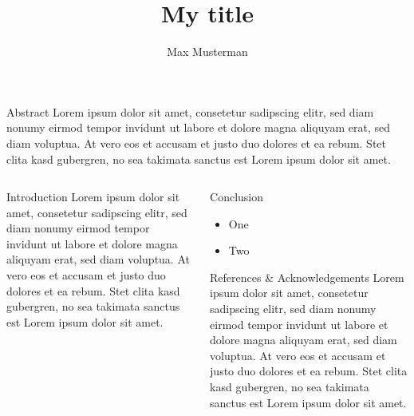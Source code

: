 \documentclass[final]{beamer}
\title{My title}
\author{Max Musterman}
\institute[]{
  Technical University of Vienna
}
\begin{document}
\begin{frame}[fragile]{}

  \begin{block}{\large Abstract}
    Lorem ipsum dolor sit amet, consetetur sadipscing elitr, sed diam nonumy
    eirmod tempor invidunt ut labore et dolore magna aliquyam erat, sed diam
    voluptua. At vero eos et accusam et justo duo dolores et ea rebum. Stet
    clita kasd gubergren, no sea takimata sanctus est Lorem ipsum dolor sit
    amet.
  \end{block}
  \begin{columns}[T]
    \begin{column}{.49\linewidth}
      \begin{block}{\large Introduction}
        Lorem ipsum dolor sit amet, consetetur sadipscing elitr, sed diam nonumy
        eirmod tempor invidunt ut labore et dolore magna aliquyam erat, sed diam
        voluptua. At vero eos et accusam et justo duo dolores et ea rebum. Stet
        clita kasd gubergren, no sea takimata sanctus est Lorem ipsum dolor sit
        amet.
      \end{block}

    \end{column}


    \begin{column}{.49\linewidth}

      \begin{block}{\large Conclusion}
        \begin{itemize}
          \item
            One
          \item
            Two
        \end{itemize}
      \end{block}

      \begin{block}{\large References \& Acknowledgements}
        Lorem ipsum dolor sit amet, consetetur sadipscing elitr, sed diam nonumy
        eirmod tempor invidunt ut labore et dolore magna aliquyam erat, sed diam
        voluptua. At vero eos et accusam et justo duo dolores et ea rebum. Stet
        clita kasd gubergren, no sea takimata sanctus est Lorem ipsum dolor sit
        amet.
      \end{block}

    \end{column}

  \end{columns}

\end{frame}
\end{document}
